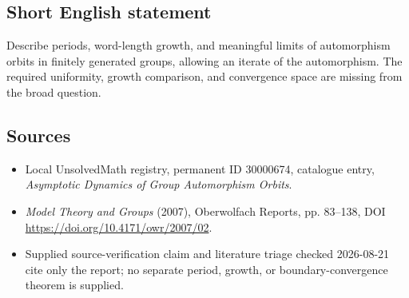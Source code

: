 \documentclass[11pt]{article}
\begin{document}
\subsection{Short English statement}
Describe periods, word-length growth, and meaningful limits of automorphism orbits in finitely generated groups, allowing an iterate of the automorphism. The required uniformity, growth comparison, and convergence space are missing from the broad question.
\subsection{Sources}
\begin{itemize}
\item Local UnsolvedMath registry, permanent ID 30000674, catalogue entry, \emph{Asymptotic Dynamics of Group Automorphism Orbits}.
\item \emph{Model Theory and Groups} (2007), Oberwolfach Reports, pp. 83--138, DOI \url{https://doi.org/10.4171/owr/2007/02}.
\item Supplied source-verification claim and literature triage checked 2026-08-21 cite only the report; no separate period, growth, or boundary-convergence theorem is supplied.
\end{itemize}
\end{document}
